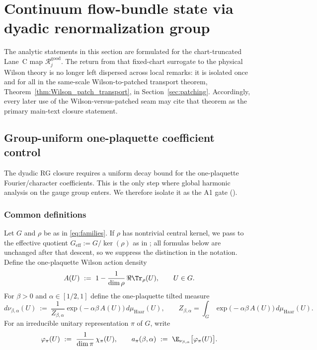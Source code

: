 \section{Continuum flow-bundle state via dyadic renormalization group}
\label{sec:rg}

The analytic statements in this section are formulated for the chart-truncated Lane~C map $\mathcal R_j^{\mathrm{good}}$.
The return from that fixed-chart surrogate to the physical Wilson theory is no longer left dispersed across local remarks: it is isolated once and for all in the same-scale Wilson-to-patched transport theorem, Theorem~\ref{thm:Wilson_patch_transport}, in Section~\ref{sec:patching}.
Accordingly, every later use of the Wilson-versus-patched seam may cite that theorem as the primary main-text closure statement.

\subsection{Group-uniform one-plaquette coefficient control}
\label{subsec:one_plaq_control}

The dyadic RG closure requires a uniform decay bound for the one-plaquette Fourier/character coefficients.
This is the only step where global harmonic analysis on the gauge group enters.
We therefore isolate it as the A1 gate ().

\subsubsection{Common definitions}
\label{subsubsec:one_plaq_common_defs}

Let $G$ and $\rho$ be as in \eqref{eq:families}.
If $\rho$ has nontrivial central kernel, we pass to the effective quotient $G_{\mathrm{eff}}:=G/\ker(\rho)$ as in ; all formulas below are unchanged after that descent, so we suppress the distinction in the notation.
Define the one-plaquette Wilson action density
\begin{equation}
\label{eq:one_plaq_action_general}
A(U)\ :=\ 1-\frac{1}{\dim\rho}\,\Re\Tr_{\rho}(U),\qquad U\in G.
\end{equation}
For $\beta>0$ and $\alpha\in[1/2,1]$ define the one-plaquette tilted measure
\begin{equation}
\label{eq:one_plaq_measure_general}
 d\nu_{\beta,\alpha}(U)\ :=\ \frac{1}{Z_{\beta,\alpha}}\exp\big(-\alpha\beta\,A(U)\big)\,d\mu_{\mathrm{Haar}}(U),
\qquad
 Z_{\beta,\alpha}=\int_G \exp\big(-\alpha\beta\,A(U)\big)\,d\mu_{\mathrm{Haar}}(U).
\end{equation}
For an irreducible unitary representation $\pi$ of $G$, write
\begin{equation}
\label{eq:one_plaq_coeff_general}
\varphi_{\pi}(U)\ :=\ \frac{1}{\dim\pi}\,\chi_{\pi}(U),
\qquad
a_{\pi}(\beta,\alpha)\ :=\ \E_{\nu_{\beta,\alpha}}\big[\varphi_{\pi}(U)\big].
\end{equation}

